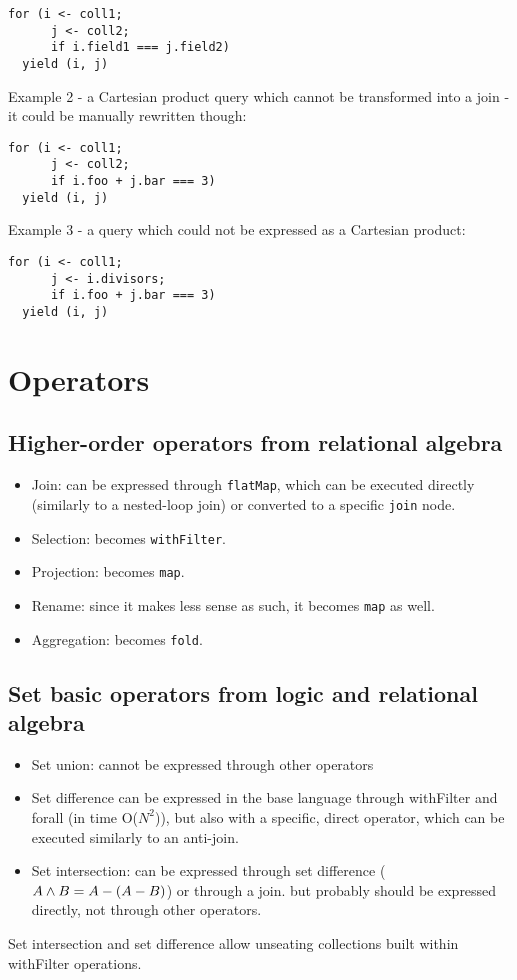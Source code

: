 \documentclass{article}
\begin{document}
\begin{verbatim}
for (i <- coll1;
      j <- coll2;
      if i.field1 === j.field2)
  yield (i, j)
\end{verbatim}
Example 2 - a Cartesian product query which cannot be transformed into a
join - it could be manually rewritten though:

\begin{verbatim}
for (i <- coll1;
      j <- coll2;
      if i.foo + j.bar === 3)
  yield (i, j)
\end{verbatim}
Example 3 - a query which could not be expressed as a Cartesian product:

\begin{verbatim}
for (i <- coll1;
      j <- i.divisors;
      if i.foo + j.bar === 3)
  yield (i, j)
\end{verbatim}
\section{Operators}

\subsection{Higher-order operators from relational algebra}

\begin{itemize}
\item
  Join: can be expressed through \texttt{flatMap}, which can be executed
  directly (similarly to a nested-loop join) or converted to a specific
  \texttt{join} node.
\item
  Selection: becomes \texttt{withFilter}.
\item
  Projection: becomes \texttt{map}.
\item
  Rename: since it makes less sense as such, it becomes \texttt{map} as
  well.
\item
  Aggregation: becomes \texttt{fold}.
\end{itemize}
\subsection{Set basic operators from logic and relational algebra}

\begin{itemize}
\item
  Set union: cannot be expressed through other operators
\item
  Set difference can be expressed in the base language through
  withFilter and forall (in time O($N^2$)), but also with a specific,
  direct operator, which can be executed similarly to an anti-join.
\item
  Set intersection: can be expressed through set difference
  ($A \wedge B = A - (A - B)$) or through a join. but probably
  should be expressed directly, not through other operators.
\end{itemize}
Set intersection and set difference allow unseating collections built
within withFilter operations.
\end{document}
